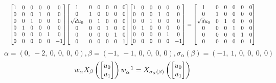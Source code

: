 \documentclass[11pt]{article}
\theoremstyle{definition}
\begin{document}
\[
\scaletoalign{\textwidth}{{\left[\begin{matrix}1 & 0 & 0 & 0 & 0 & 0\\0 & 0 & 0 & 1 & 0 & 0\\0 & 0 & 1 & 0 & 0 & 0\\0 & 1 & 0 & 0 & 0 & 0\\0 & 0 & 0 & 0 & 1 & 0\\0 & 0 & 0 & 0 & 0 & -1\end{matrix}\right]} {\left[\begin{matrix}1 & 0 & 0 & 0 & 0 & 0\\0 & 1 & 0 & 0 & 0 & 0\\\sqrt{d} u_{0} & 0 & 1 & 0 & 0 & 0\\0 & 0 & 0 & 1 & 0 & 0\\0 & 0 & 0 & 0 & 1 & 0\\0 & 0 & 0 & 0 & 0 & 1\end{matrix}\right]} {\left[\begin{matrix}1 & 0 & 0 & 0 & 0 & 0\\0 & 0 & 0 & 1 & 0 & 0\\0 & 0 & 1 & 0 & 0 & 0\\0 & 1 & 0 & 0 & 0 & 0\\0 & 0 & 0 & 0 & 1 & 0\\0 & 0 & 0 & 0 & 0 & -1\end{matrix}\right]} = {\left[\begin{matrix}1 & 0 & 0 & 0 & 0 & 0\\0 & 1 & 0 & 0 & 0 & 0\\\sqrt{d} u_{0} & 0 & 1 & 0 & 0 & 0\\0 & 0 & 0 & 1 & 0 & 0\\0 & 0 & 0 & 0 & 1 & 0\\0 & 0 & 0 & 0 & 0 & 1\end{matrix}\right]}}
\]
\[
\alpha = \left( 0, \  -2, \  0, \  0, \  0, \  0\right), \beta = \left( -1, \  -1, \  0, \  0, \  0, \  0\right), \sigma_{\alpha}(\beta) = \left( -1, \  1, \  0, \  0, \  0, \  0\right)
\]
\[
\scaletoalign{\textwidth}{w_{\alpha} X_{\beta}\left(\left[\begin{matrix}u_{0}\\u_{1}\end{matrix}\right]\right) w_{\alpha}^{-1} = X_{\sigma_{\alpha}\left(\beta\right)}\left(\left[\begin{matrix}u_{0}\\u_{1}\end{matrix}\right]\right)}
\]
\end{document}
